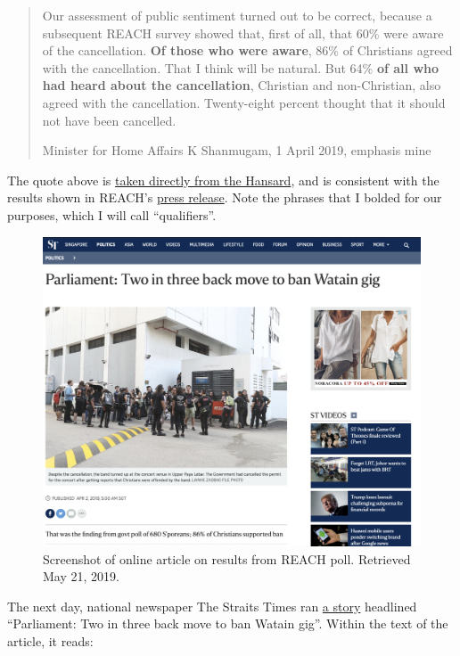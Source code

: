 \documentclass[
  openany]{book}
\begin{document}
\begin{quote}
Our assessment of public sentiment turned out to be correct, because a subsequent REACH survey showed that, first of all, that 60\% were aware of the cancellation. \textbf{Of those who were aware}, 86\% of Christians agreed with the cancellation. That I think will be natural. But 64\% \textbf{of all who had heard about the cancellation}, Christian and non-Christian, also agreed with the cancellation. Twenty-eight percent thought that it should not have been cancelled.

Minister for Home Affairs K Shanmugam, 1 April 2019, emphasis mine
\end{quote}

The quote above is \href{https://sprs.parl.gov.sg/search/sprs3topic?reportid=ministerial-statement-1170}{taken directly from the Hansard}, and is consistent with the results shown in REACH's \href{https://www.reach.gov.sg/~/media/2019/press-release/findings-of-poll-on-watain-concert--1-april-2019.pdf}{press release}. Note the phrases that I bolded for our purposes, which I will call ``qualifiers''.

\begin{figure}

{\centering \includegraphics[width=0.8\linewidth]{images/proportion/STwatain} 

}

\caption{Screenshot of online article on results from REACH poll. Retrieved May 21, 2019.}\label{fig:st-watain}
\end{figure}

The next day, national newspaper The Straits Times ran \href{https://www.straitstimes.com/politics/singapolitics/parliament-two-out-of-three-singaporeans-back-governments-move-to-cancel}{a story} headlined ``Parliament: Two in three back move to ban Watain gig''. Within the text of the article, it reads:
\end{document}

